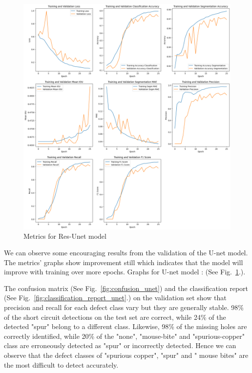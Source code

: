\documentclass[12pt]{article}
\begin{document}
\begin{figure}[H]
    \centering
    \includegraphics[width=\textwidth, keepaspectratio]{./graphics/graphs_vertical.png}
    \caption{Metrics for Res-Unet model}
    \label{fig:graphs_unet}
\end{figure}
\restoregeometry
\clearpage


We can observe some encouraging results from the validation of the U-net model. The metrics' graphs show improvement still which indicates that the model will improve with training over more epochs. 
Graphs for U-net model : (See Fig.~\ref{fig:graphs_unet}.).

The confusion matrix (See Fig.~\ref{fig:confusion_unet}) and the classification report (See Fig.~\ref{fig:classification_report_unet}.) on the validation set show that precision and recall for each defect class vary but they are generally stable. 98\% of the short circuit detections on the test set are correct, while 24\% of the detected "spur" belong to a different class. Likewise, 98\% of the missing holes are correctly identified, while 20\% of the "none", "mouse-bite" and "spurious-copper" class are erroneously detected as "spur" or incorrectly detected. Hence we can observe that the defect classes of "spurious copper", "spur" and " mouse bites" are the most difficult to detect accurately. 
\end{document}
